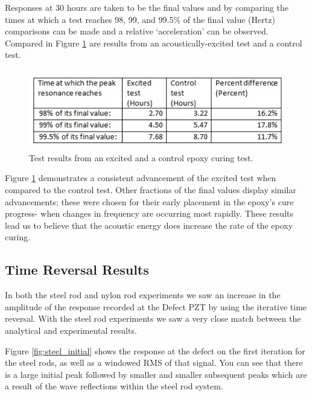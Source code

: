 \documentclass[]{aiaa-tc}%
\begin{document}
Responses at 30 hours are taken to be the final values and by comparing the times at which a test reaches 98, 99, and 99.5\% of the final value (Hertz) comparisons can be made and a relative ‘acceleration’ can be observed.  Compared in Figure \ref{fig:epoxy_table} are results from an acoustically-excited test and a control test.

\begin{figure}[H]%
\centering
 \includegraphics[height = 3.5cm]{epoxy_table}
 \caption{Test results from an excited and a control epoxy curing test.}
 \label{fig:epoxy_table}
\end{figure}

Figure \ref{fig:epoxy_table} demonstrates a consistent advancement of the excited test when compared to the control test.  Other fractions of the final values display similar advancements; these were chosen for their early placement in the epoxy’s cure progress- when changes in frequency are occurring most rapidly.  These results lead us to believe that the acoustic energy does increase the rate of the epoxy curing.

\subsection{Time Reversal Results}

In both the steel rod and nylon rod experiments we saw an increase in the amplitude of the response recorded at the Defect PZT by using the iterative time reversal. With the steel rod experiments we saw a very close match between the analytical and experimental results.  

Figure \ref{fig:steel_initial} shows the response at the defect on the first iteration for the steel rods, as well as a windowed RMS of that signal. You can see that there is a large initial peak followed by smaller and smaller subsequent peaks which are a result of the wave reflections within the steel rod system.
\end{document}
